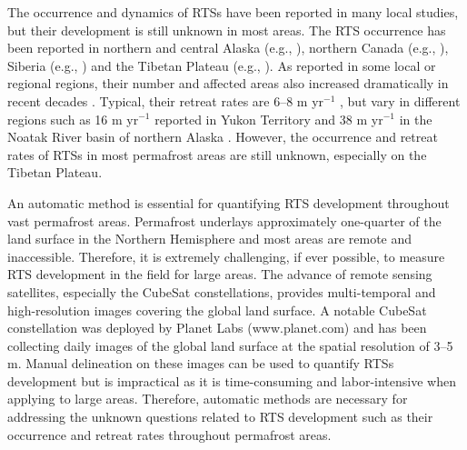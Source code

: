 \documentclass[authoryear,preprint,review,12pt]{elsarticle}
\begin{document}
The occurrence and dynamics of RTSs have been reported in many local studies, but their development is still unknown in most areas. 
The RTS occurrence has been reported in northern and central Alaska (e.g., \citealp{swanson2018growth,balser2014timing}), northern Canada (e.g., \citealp{burn1990canadian, cassidy2017impacts, armstrong2018thaw,lewkowicz2019extremes}), Siberia (e.g., \citealp{leibman2003dynamics, zwieback2018sub}) and the Tibetan Plateau (e.g., \citealp{niu2005engineering, niu2016thaw}). 
As reported in some local or regional regions, their number and affected areas also increased dramatically in recent decades \citep{luo2019recent, lewkowicz2019extremes}.
Typical, their retreat rates are 6--8 m yr$^{-1}$ \citep{jorgenson_thermokarst_2013}, but vary in different regions such as 16 m yr$^{-1}$ reported in Yukon Territory \citep{burn1989geomorphology} and 38 m yr$^{-1}$  in the Noatak River basin of northern  Alaska \citep{swanson2018growth}.
However, the occurrence and retreat rates of RTSs in most permafrost areas are still unknown, especially on the Tibetan Plateau. 

An automatic method is essential for quantifying RTS development throughout vast permafrost areas. 
Permafrost underlays approximately one-quarter of the land surface in the Northern Hemisphere \citep{zhang1999statistics} and most areas are remote and inaccessible. %
Therefore, it is extremely challenging, if ever possible, to measure RTS development in the field for large areas. %
The advance of remote sensing satellites, especially the CubeSat constellations, provides multi-temporal and high-resolution images covering the global land surface. 
A notable CubeSat constellation was deployed by Planet Labs (www.planet.com) and has been collecting daily images of the global land surface at the spatial resolution of 3--5 m.
Manual delineation on these images can be used to quantify RTSs development but is impractical as it is time-consuming and labor-intensive when applying to large areas. %
Therefore, automatic methods are necessary for addressing the unknown questions related to RTS development such as their occurrence and retreat rates throughout permafrost areas. 
\end{document}
